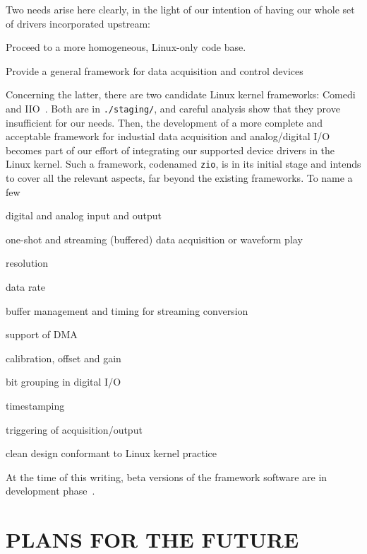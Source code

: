 \documentclass{JAC2003}
\begin{document}
Two needs arise here clearly, in the light of our intention of having
our whole set of drivers incorporated upstream:
\begin{Itemize}
\item Proceed to a more homogeneous, Linux-only code base.
\item Provide a general framework for data acquisition and control
devices
\end{Itemize}
Concerning the latter,
there are two candidate Linux kernel frameworks:
Comedi~\cite{comedi} and IIO~\cite{iio}. Both are in
\texttt{./staging/}, and careful analysis show that they prove
insufficient for our needs. Then, the development of a more complete and
acceptable framework for industial data acquisition and analog/digital
I/O becomes part of our effort of integrating our supported
device drivers in the Linux kernel. Such a framework,
codenamed \texttt{zio}, is in its initial stage and intends to cover
all the relevant aspects, far beyond the existing frameworks. To name a
few
\begin{Itemize}
\item digital and analog input and output
\item one-shot and streaming (buffered) data acquisition or waveform play
\item resolution
\item data rate
\item buffer management and timing for streaming conversion
\item support of DMA
\item calibration, offset and gain
\item bit grouping in digital I/O
\item timestamping
\item triggering of acquisition/output
\item clean design conformant to Linux kernel practice
\end{Itemize}

At the time of this writing, beta versions of the framework software
are in development phase~\cite{zio-git}.

\section{PLANS FOR THE FUTURE}
\end{document}
